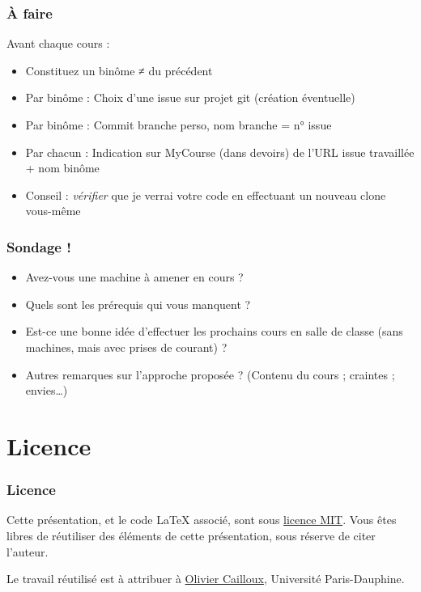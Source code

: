 \documentclass[english, french]{beamer}
\begin{document}
\begin{frame}
	\frametitle{À faire}
	Avant chaque cours :
	\begin{itemize}
		\item Constituez un binôme ≠ du précédent
		\item Par binôme : Choix d’une issue sur projet git (création éventuelle)
		\item Par binôme : Commit branche perso, nom branche = n° issue
		\item Par chacun : Indication sur MyCourse (dans devoirs) de l’URL issue travaillée + nom binôme
		\item Conseil : \emph{vérifier} que je verrai votre code en effectuant un nouveau clone vous-même
	\end{itemize}
\end{frame}

\begin{frame}
	\frametitle{Sondage !}
	\begin{itemize}
		\item Avez-vous une machine à amener en cours ?
		\item Quels sont les prérequis qui vous manquent ?
		\item Est-ce une bonne idée d’effectuer les prochains cours en salle de classe (sans machines, mais avec prises de courant) ?
		\item Autres remarques sur l’approche proposée ? (Contenu du cours ; craintes ; envies…)
	\end{itemize}
\end{frame}

\appendix
\section{Licence}
\begin{frame}
	\frametitle{Licence}
	Cette présentation, et le code LaTeX associé, sont sous \href{http://opensource.org/licenses/MIT}{licence MIT}. Vous êtes libres de réutiliser des éléments de cette présentation, sous réserve de citer l’auteur.
	
	Le travail réutilisé est à attribuer à \href{http://www.lamsade.dauphine.fr/~ocailloux/}{Olivier Cailloux}, Université Paris-Dauphine.
\end{frame}
\end{document}
